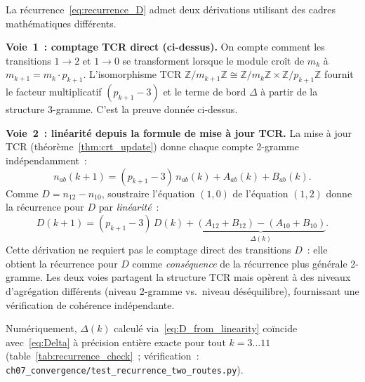 \documentclass[12pt,a4paper]{article}
\begin{document}
\begin{remarque}
\label{rem:recurrence_routes}
La récurrence~\eqref{eq:recurrence_D} admet deux dérivations utilisant
des cadres mathématiques différents.

\textbf{Voie~1~: comptage TCR direct (ci-dessus).}
On compte comment les transitions $1 \to 2$ et $1 \to 0$ se
transforment lorsque le module croît de $m_k$ à
$m_{k+1} = m_k \cdot p_{k+1}$. L'isomorphisme TCR
$\mathbb{Z}/m_{k+1}\mathbb{Z} \cong \mathbb{Z}/m_k\mathbb{Z} \times
\mathbb{Z}/p_{k+1}\mathbb{Z}$ fournit le facteur multiplicatif
$(p_{k+1} - 3)$ et le terme de bord $\Delta$ à partir de la structure
3-gramme. C'est la preuve donnée ci-dessus.

\textbf{Voie~2~: linéarité depuis la formule de mise à jour TCR.}
La mise à jour TCR (théorème~\ref{thm:crt_update}) donne chaque
compte 2-gramme indépendamment~:
\[
  n_{ab}(k+1) = (p_{k+1} - 3)\,n_{ab}(k) + A_{ab}(k) + B_{ab}(k).
\]
Comme $D = n_{12} - n_{10}$, soustraire l'équation $(1,0)$ de
l'équation $(1,2)$ donne la récurrence pour $D$ par \emph{linéarité}~:
\begin{equation}
  D(k+1) = (p_{k+1} - 3)\,D(k) + \underbrace{(A_{12} + B_{12}) - (A_{10} + B_{10})}_{\Delta(k)}.
  \label{eq:D_from_linearity}
\end{equation}
Cette dérivation ne requiert pas le comptage direct des transitions
$D$~: elle obtient la récurrence pour $D$ comme \emph{conséquence}
de la récurrence plus générale 2-gramme. Les deux voies partagent la
structure TCR mais opèrent à des niveaux d'agrégation différents
(niveau 2-gramme vs.\ niveau déséquilibre), fournissant une
vérification de cohérence indépendante.

Numériquement, $\Delta(k)$ calculé via~\eqref{eq:D_from_linearity}
coïncide avec~\eqref{eq:Delta} à précision entière exacte pour tout
$k = 3\ldots 11$ (table~\ref{tab:recurrence_check}~; vérification~:
\texttt{ch07\_convergence/test\_recurrence\_two\_routes.py}).
\end{remarque}
\end{document}
